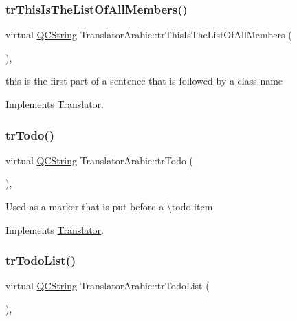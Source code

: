 \subsubsection{\texorpdfstring{trThisIsTheListOfAllMembers()}{trThisIsTheListOfAllMembers()}}
{\footnotesize\ttfamily virtual \mbox{\hyperlink{class_q_c_string}{Q\+C\+String}} Translator\+Arabic\+::tr\+This\+Is\+The\+List\+Of\+All\+Members (\begin{DoxyParamCaption}{ }\end{DoxyParamCaption})\hspace{0.3cm}{\ttfamily [inline]}, {\ttfamily [virtual]}}

this is the first part of a sentence that is followed by a class name 

Implements \mbox{\hyperlink{class_translator}{Translator}}.

\mbox{\label{class_translator_arabic_a3ee1a40eef4aab1fdff51a79cd2d8428}} 
\subsubsection{\texorpdfstring{trTodo()}{trTodo()}}
{\footnotesize\ttfamily virtual \mbox{\hyperlink{class_q_c_string}{Q\+C\+String}} Translator\+Arabic\+::tr\+Todo (\begin{DoxyParamCaption}{ }\end{DoxyParamCaption})\hspace{0.3cm}{\ttfamily [inline]}, {\ttfamily [virtual]}}

Used as a marker that is put before a \textbackslash{}todo item 

Implements \mbox{\hyperlink{class_translator}{Translator}}.

\mbox{\label{class_translator_arabic_a0e49c3992d6c22a1fa7d9b9153c8e93e}} 
\subsubsection{\texorpdfstring{trTodoList()}{trTodoList()}}
{\footnotesize\ttfamily virtual \mbox{\hyperlink{class_q_c_string}{Q\+C\+String}} Translator\+Arabic\+::tr\+Todo\+List (\begin{DoxyParamCaption}{ }\end{DoxyParamCaption})\hspace{0.3cm}{\ttfamily [inline]}, {\ttfamily [virtual]}}

